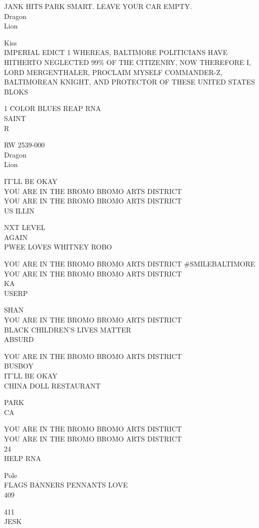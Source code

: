 \documentclass[10pt,letterpaper]{article}
\begin{document}
JANK HITS PARK SMART. LEAVE YOUR CAR EMPTY.\\
Dragon\\
Lion

Kiss\\
IMPERIAL EDICT 1 WHEREAS, BALTIMORE POLITICIANS HAVE HITHERTO NEGLECTED 99\% OF THE CITIZENRY, NOW THEREFORE I, LORD MERGENTHALER, PROCLAIM MYSELF COMMANDER{-}Z, BALTIMOREAN KNIGHT, AND PROTECTOR OF THESE UNITED STATES\\
BLOKS

1 COLOR BLUES REAP RNA\\
SAINT\\
R

RW 2539{-}000\\
Dragon\\
Lion

IT'LL BE OKAY\\
YOU ARE IN THE BROMO BROMO ARTS DISTRICT\\
YOU ARE IN THE BROMO BROMO ARTS DISTRICT\\
US ILLIN

NXT LEVEL\\
AGAIN\\
PWEE LOVES WHITNEY ROBO

YOU ARE IN THE BROMO BROMO ARTS DISTRICT \#SMILEBALTIMORE\\
YOU ARE IN THE BROMO BROMO ARTS DISTRICT\\
KA\\
USERP

SHAN\\
YOU ARE IN THE BROMO BROMO ARTS DISTRICT\\
BLACK CHILDREN'S LIVES MATTER\\
ABSURD

YOU ARE IN THE BROMO BROMO ARTS DISTRICT\\
BUSBOY\\
IT'LL BE OKAY\\
CHINA DOLL RESTAURANT

PARK\\
CA

YOU ARE IN THE BROMO BROMO ARTS DISTRICT\\
YOU ARE IN THE BROMO BROMO ARTS DISTRICT\\
24\\
HELP RNA

Pole\\
FLAGS BANNERS PENNANTS LOVE\\
409

411\\
JESK
\end{document}
